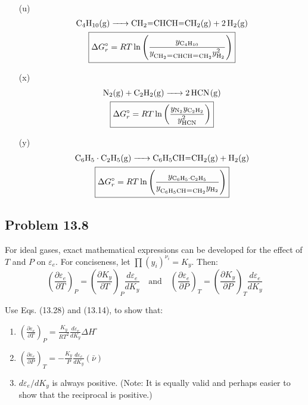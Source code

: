 \begin{solution}
\begin{enumerate}
\begin{gather*}
      \end{gather*}
    \item[(u)]
      \begin{gather*}
        \ce{C4H10(g) -> CH2=CHCH=CH2(g) + 2H2(g)} \\
        \boxed{\Delta G_r^\circ =
        RT\ln\left(\frac{y_{\ce{C4H10}}}{y_{\ce{CH2=CHCH=CH2}}y_{\ce{H2}}^2}\right)}
      \end{gather*}
    \item[(x)]
      \begin{gather*}
        \ce{N2(g) + C2H2(g) -> 2HCN(g)} \\
        \boxed{\Delta G_r^\circ =
        RT\ln\left(\frac{y_{\ce{N2}}y_{\ce{C2H2}}}{y_{\ce{HCN}}^2}\right)}
      \end{gather*}
    \item[(y)]
      \begin{gather*}
        \ce{C6H5\cdot C2H5(g) -> C6H5CH=CH2(g) + H2(g)} \\
        \boxed{\Delta G_r^\circ =
          RT\ln\left(\frac{y_{\ce{C6H5\cdot
        C2H5}}}{y_{\ce{C6H5CH=CH2}}y_{\ce{H2}}}\right)}
      \end{gather*}
  \end{enumerate}
\end{solution}

\subsection*{Problem 13.8}
For ideal gases, exact mathematical expressions can be developed for
the effect of $T$ and $P$ on $\varepsilon_e$. For conciseness, let
$\prod (y_i)^{\nu_i} = K_y$. Then:
\begin{equation*}
  \left(\frac{\partial \varepsilon_e}{\partial T}\right)_P =
  \left(\frac{\partial K_y}{\partial T}\right)_P
  \frac{d\varepsilon_e}{dK_y} \quad \text{and} \quad
  \left(\frac{\partial \varepsilon_e}{\partial P}\right)_T =
  \left(\frac{\partial K_y}{\partial P}\right)_T \frac{d\varepsilon_e}{dK_y}
\end{equation*}

Use Eqs. (13.28) and (13.14), to show that:
\begin{enumerate}[label=(\alph*)]
  \item \(\displaystyle \left(\frac{\partial \varepsilon_e}{\partial
    T}\right)_P = \frac{K_y}{RT^2} \frac{d\varepsilon_e}{dK_y} \Delta H^\circ\)
  \item \(\displaystyle \left(\frac{\partial \varepsilon_e}{\partial
    P}\right)_T = -\frac{K_y}{P} \frac{d\varepsilon_e}{dK_y} (\bar{\nu})\)
  \item $d\varepsilon_e / dK_y$ is always positive. (Note: It is
    equally valid and perhaps easier to show that the reciprocal is positive.)
\end{enumerate}

